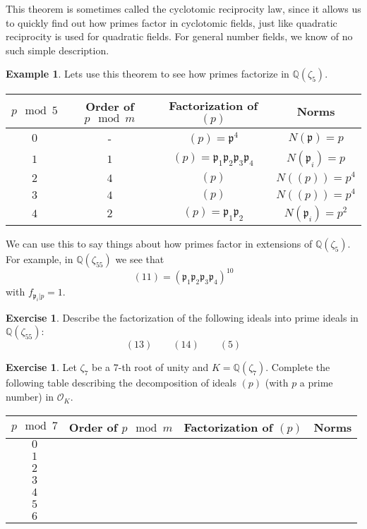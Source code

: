 \documentclass[11pt,a4paper]{report}
\theoremstyle{plain}
\theoremstyle{definition}
\newtheorem{exmp}[subsection]{Example}
\theoremstyle{definition}
\newtheorem{question}[subsection]{Exercise}
\def\QQ{\mathbb{Q}}
\def\gothp{\mathfrak{p}}
\def \OO {\mathcal{O}}
\begin{document}
This theorem is sometimes called the cyclotomic reciprocity law, since it allows us to quickly find out how primes factor in cyclotomic fields, just like quadratic reciprocity is used for quadratic fields. For general number fields, we know of no such simple description.


\begin{exmp}
	Lets use this theorem to see how primes factorize in $\QQ(\zeta_5)$. 
	\begin{center}
		\begin{tabular}{ |c | c |  c |  c |}
			\hline
			
			$p \mod 5$ & Order of  $p \mod m$ & Factorization of $(p)$ & Norms   \\ \hline
			$0$ & - & $(p)=\gothp^4$ & $N(\gothp)=p$ \\  \hline
			$1$ & $1$ & $(p)=\gothp_1\gothp_2\gothp_3\gothp_4$ & $N(\gothp_i)=p$ \\  \hline
			$2$ & $4$ & $(p)$ & $N((p))=p^4$ \\  \hline
			$3$ & $4$ & $(p)$ & $N((p))=p^4$ \\  \hline	
			$4$ & $2$& $(p)=\gothp_{1}\gothp_2$& $N(\gothp_i)=p^2$ \\  \hline
			
		\end{tabular}			
	\end{center}
	
	We can use this to say things about how primes factor in extensions of $\QQ(\zeta_5)$. For example, in $\QQ(\zeta_{55})$ we see that \[(11)=(\gothp_1\gothp_2\gothp_3\gothp_4)^{10}\] with $f_{\gothp_i|p}=1$.
	
\end{exmp}

\begin{question}
	Describe the factorization of the following ideals into prime ideals  in $\QQ(\zeta_{55})$:
	\[(13) \qquad (14) \qquad (5) \]
\end{question}


\begin{question}
	Let $\zeta_7$  be a $7$-th root of unity and $K=\QQ(\zeta_7)$. Complete the following table describing the decomposition of ideals $(p)$ (with $p$ a prime number) in $\OO_K$.
	\begin{center}
		\begin{tabular}{ | c | c |  c | c |}
			\hline
			
			$p \mod 7$ & Order of  $p \mod m$ & Factorization of $(p)$ & Norms   \\ \hline
			$0$ &  &  &  \\  \hline
			$1$ &  & &  \\  \hline
			$2$ &  & &  \\  \hline
			$3$ &  &  &  \\  \hline	
			$4$ & & & \\  \hline
			$5$ &  & & \\  \hline
			$6$ &  &  & \\  \hline
		\end{tabular}			
	\end{center}
	
\end{question}
\end{document}
